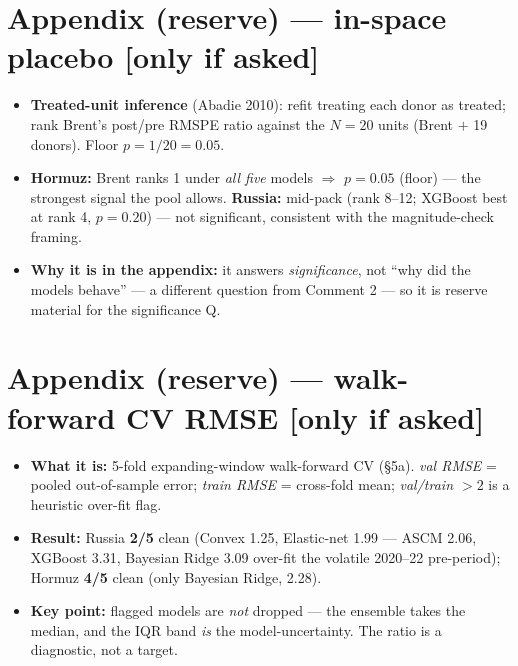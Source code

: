 \documentclass[11pt,a4paper]{article}
\newcommand{\timetag}[1]{\hfill\textcolor{muted}{\small[#1]}}
\newcommand{\highlight}[1]{\textcolor{accent}{\textbf{#1}}}
\begin{document}
\section{Appendix (reserve) --- in-space placebo \timetag{only if asked}}
\begin{itemize}
  \item \highlight{Treated-unit inference} (Abadie 2010): refit treating each donor as treated; rank
    Brent's post/pre RMSPE ratio against the $N=20$ units (Brent $+$ 19 donors). Floor $p = 1/20 = 0.05$.
  \item \highlight{Hormuz:} Brent ranks 1 under \emph{all five} models $\Rightarrow$ $p = 0.05$ (floor) ---
    the strongest signal the pool allows. \highlight{Russia:} mid-pack (rank 8--12; XGBoost best at rank 4,
    $p = 0.20$) --- not significant, consistent with the magnitude-check framing.
  \item \highlight{Why it is in the appendix:} it answers \emph{significance}, not ``why did the models
    behave'' --- a different question from Comment 2 --- so it is reserve material for the significance Q.
\end{itemize}

\section{Appendix (reserve) --- walk-forward CV RMSE \timetag{only if asked}}
\begin{itemize}
  \item \highlight{What it is:} 5-fold expanding-window walk-forward CV (\S5a). \emph{val RMSE} = pooled
    out-of-sample error; \emph{train RMSE} = cross-fold mean; \emph{val/train $>2$} is a heuristic over-fit flag.
  \item \highlight{Result:} Russia \textbf{2/5} clean (Convex 1.25, Elastic-net 1.99 --- ASCM 2.06, XGBoost
    3.31, Bayesian Ridge 3.09 over-fit the volatile 2020--22 pre-period); Hormuz \textbf{4/5} clean (only
    Bayesian Ridge, 2.28).
  \item \highlight{Key point:} flagged models are \emph{not} dropped --- the ensemble takes the median, and
    the IQR band \emph{is} the model-uncertainty. The ratio is a diagnostic, not a target.
\end{itemize}

\end{document}
